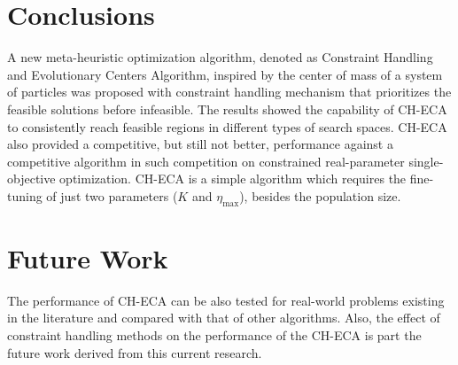 \documentclass[conference]{IEEEtran}
\begin{document}
\section{Conclusions} %
\label{sec:conclusions}

A new meta-heuristic optimization algorithm, denoted as Constraint Handling and 
Evolutionary Centers  Algorithm, inspired by the center of mass of a system of 
particles was proposed with constraint handling mechanism that prioritizes the 
feasible solutions before infeasible. The results showed the capability of CH-ECA 
to consistently reach feasible regions  in different types of search spaces. CH-ECA also provided 
a competitive, but still not better, performance against a competitive algorithm 
in such  competition on constrained real-parameter single-objective optimization. 
CH-ECA  is a simple algorithm which requires the fine-tuning of just two parameters 
($K$ and $\eta_{\max}$),  besides the population size.


\section{Future Work} %
\label{sec:future_work}

The performance of CH-ECA can be also tested for real-world problems existing in 
the literature and compared with that of other algorithms. Also, the effect of 
constraint handling methods on the performance of the CH-ECA is part the future 
work derived from this current research. 




\end{document}

